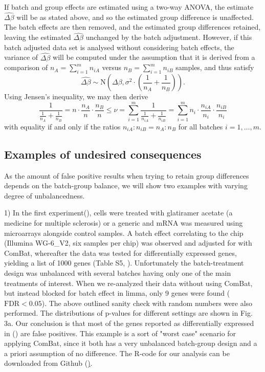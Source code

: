 \documentclass{bio}
\begin{document}
If batch and group effects are estimated using a two-way ANOVA, the estimate $\widehat{\Delta\beta}$ will be as stated above, and so the estimated group difference is unaffected. The batch effects are then removed, and the estimated group differences retained, leaving the estimated $\widehat{\Delta\beta}$ unchanged by the batch adjustment. However, if this batch adjusted data set is analysed without considering batch effects, the variance of $\widehat{\Delta\beta}$ will be computed under the assumption that it is derived from a comparison of $n_A=\sum_{i=1}^m n_{iA}$ versus $n_B=\sum_{i=1}^m n_{iB}$ samples, and thus satisfy
\begin{equation}
\widehat{\Delta\beta}
\sim\text{N}\left(\Delta\beta,\sigma^2\cdot\left(\frac{1}{n_A}+\frac{1}{n_B}\right)\right).
\end{equation}
Using Jensen's inequality, we may then derive
\begin{equation}
\frac{1}{\frac{1}{n_A}+\frac{1}{n_B}}=n\cdot\frac{n_A}{n}\cdot\frac{n_B}{n}
\le
\nu
=\sum_{i=1}^m \frac{1}{\frac{1}{n_{iA}}+\frac{1}{n_{iB}}}
=\sum_{i=1}^m n_i\cdot\frac{n_{iA}}{n_i}\cdot\frac{n_{iB}}{n_i}
\end{equation}
with equality if and only if the ratios $n_{iA}:n_{iB}=n_A:n_B$ for all batches $i=1,\ldots,m$.



\subsection{Examples of undesired consequences}

As the amount of false positive results when trying to retain group differences depends on the batch-group balance, we will show two examples with varying degree of unbalancedness. 

1) In the first experiment(\citealp{Towfic2014}), cells were treated with glatiramer acetate (a medicine for multiple sclerosis) or a generic and mRNA was measured using microarrays alongside control samples. A batch effect correlating to the chip (Illumina WG-6\_V2, six samples per chip) was observed and adjusted for with ComBat, whereafter the data was tested for differentially expressed genes, yielding a list of 1000 genes (Table S5, \citealp{Towfic2014}). Unfortunately the batch-treatment design was unbalanced with several batches having only one of the main treatments of interest. When we re-analyzed their data without using ComBat, but instead blocked for batch effect in limma, only 9 genes were found ($\text{FDR}<0.05$). The above outlined sanity check with random numbers were also performed. The distributions of p-values for different settings are shown in Fig. 3a.  Our conclusion is that most of the genes reported as differentially expressed in (\citealp{Towfic2014}) are false positives. This example is a sort of "worst case" scenario for applying ComBat, since it both has a very unbalanced batch-group design and a a priori assumption of no difference. The R-code for our analysis can be downloaded from Github (\href{https://github.com/ous-uio-bioinfo-core/batch-adjust-warning-figures.git}).
\end{document}
